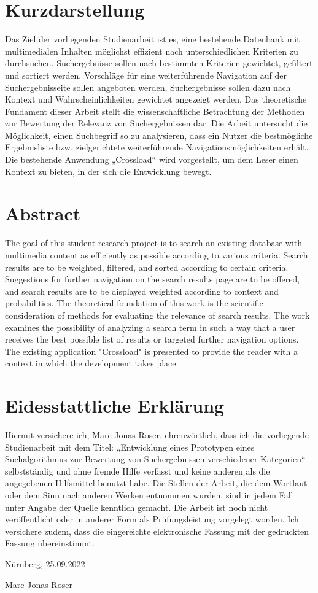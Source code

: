 \thispagestyle{empty}
\section*{Kurzdarstellung}
\label{sec:kurzdarstellung}
Das Ziel der vorliegenden Studienarbeit ist es, eine bestehende Datenbank mit multimedialen Inhalten möglichst effizient nach unterschiedlichen Kriterien zu durchsuchen.
Suchergebnisse sollen nach bestimmten Kriterien gewichtet, gefiltert und sortiert werden. Vorschläge für eine weiterführende Navigation auf der Suchergebnisseite sollen angeboten werden, Suchergebnisse sollen dazu nach Kontext und Wahrscheinlichkeiten gewichtet angezeigt werden.
Das theoretische Fundament dieser Arbeit stellt die wissenschaftliche Betrachtung der Methoden zur Bewertung der Relevanz von Suchergebnissen dar. Die Arbeit untersucht die Möglichkeit, einen Suchbegriff so zu analysieren, dass ein Nutzer die bestmögliche Ergebnisliste bzw. zielgerichtete weiterführende Navigationsmöglichkeiten erhält.
Die bestehende Anwendung „Crossload“ wird vorgestellt, um dem Leser einen Kontext zu bieten, in der sich die Entwicklung bewegt.

\section*{Abstract}
\label{sec:abstract}
The goal of this student research project is to search an existing database with multimedia content as efficiently as possible according to various criteria.
Search results are to be weighted, filtered, and sorted according to certain criteria. Suggestions for further navigation on the search results page are to be offered, and search results are to be displayed weighted according to context and probabilities.
The theoretical foundation of this work is the scientific consideration of methods for evaluating the relevance of search results. The work examines the possibility of analyzing a search term in such a way that a user receives the best possible list of results or targeted further navigation options.
The existing application "Crossload" is presented to provide the reader with a context in which the development takes place.

\cleardoublepage

\section*{Eidesstattliche Erklärung}
\label{sec:explanation}
Hiermit versichere ich, Marc Jonas Roser, ehrenwörtlich, dass ich die vorliegende Studienarbeit mit dem Titel: „Entwicklung eines Prototypen eines Suchalgorithmus zur Bewertung von Suchergebnissen verschiedener Kategorien“ selbstständig und ohne fremde Hilfe verfasst und keine anderen als die angegebenen Hilfsmittel benutzt habe. Die Stellen der Arbeit, die dem Wortlaut oder dem Sinn nach anderen Werken entnommen wurden, sind in jedem Fall unter Angabe der Quelle kenntlich gemacht. Die Arbeit ist noch nicht veröffentlicht oder in anderer Form als Prüfungsleistung vorgelegt worden.
Ich versichere zudem, dass die eingereichte elektronische Fassung mit der gedruckten Fassung übereinstimmt.

Nürnberg, 25.09.2022

Marc Jonas Roser
